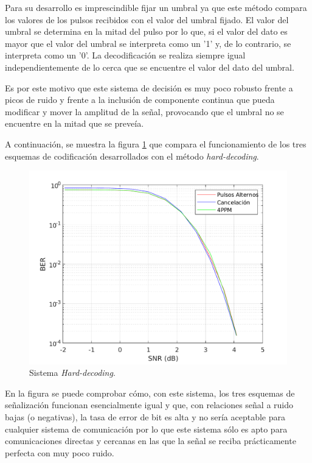 Para su desarrollo es imprescindible fijar un umbral ya que este método compara los 
valores de los pulsos recibidos con el valor del umbral fijado. El valor del umbral se 
determina en la mitad del pulso por lo que, si el valor del dato es mayor que el valor 
del umbral se interpreta como un '1' y, de lo contrario, se interpreta como un '0'.
La decodificación se realiza siempre igual independientemente de lo cerca que se encuentre 
el valor del dato del umbral. \cite{hard}

Es por este motivo que este sistema de decisión es muy poco robusto frente a picos de 
ruido y frente a la inclusión de componente continua que pueda modificar y mover 
la amplitud de la señal, provocando que el umbral no se encuentre en la mitad que 
se preveía.

A continuación, se muestra la figura \ref{hard-decoding} que compara el funcionamiento de 
los tres esquemas de codificación desarrollados con el método \textit{hard-decoding}.

\begin{figure}[ht]
    \centering
    \includegraphics[scale=0.52]{./figuras/Hard.pdf}
    \caption{\small{Sistema \textit{Hard-decoding}.}}
    \label{hard-decoding}%
\end{figure}

En la figura se puede comprobar cómo, con este sistema, los tres esquemas de señalización 
funcionan esencialmente igual y que, con relaciones señal a ruido bajas (o negativas), la 
tasa de error de bit es alta y no sería aceptable para cualquier sistema de comunicación
por lo que este sistema sólo es apto para comunicaciones directas y cercanas en las que 
la señal se reciba prácticamente perfecta con muy poco ruido.

